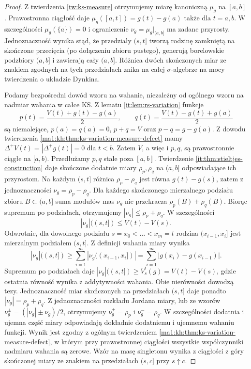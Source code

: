 \begin{proof}
Z twierdzenia \ref{tw:ks-measure} otrzymujemy miarę
kanoniczną $\mu_g$ na $[a,b]$. Prawostronna ciągłość
daje $\mu_g([a,t])=g(t)-g(a)$ także dla $t=a,b$.
W szczególności $\mu_g(\{a\})=0$ i ograniczenie
$\nu_g=\mu_g|_{(a,b]}$ ma zadane przyrosty.
Jednoznaczność wynika stąd, że przedziały $(s,t]$
tworzą rodzinę zamkniętą na skończone przecięcia
(po dołączeniu zbioru pustego), generują borelowskie
podzbiory $(a,b]$ i zawierają cały $(a,b]$.
Różnica dwóch skończonych miar ze znakiem zgodnych
na tych przedziałach znika na całej $\sigma$-algebrze
na mocy twierdzenia o układzie Dynkina.

Podamy bezpośredni dowód wzoru na wahanie, niezależny
od ogólnego wzoru na nadmiar wahania w całce KS.
Z lematu \ref{it:lem:rs-variation} funkcje
\[
 p(t)=\frac{V(t)+g(t)-g(a)}2,\qquad
 q(t)=\frac{V(t)-g(t)+g(a)}2
\]
są niemalejące, $p(a)=q(a)=0$, $p+q=V$
oraz $p-q=g-g(a)$.
Z dowodu twierdzenia
\ref{ma1:kh:thm:ks-variation-measure-defect} mamy
$\Delta^+V(t)=|\Delta^+g(t)|=0$ dla $t<b$.
Zatem $V$, a więc i $p,q$, są prawostronnie ciągłe
na $[a,b)$. Przedłużamy $p,q$ stale poza $[a,b]$.
Twierdzenie \ref{it:thm:stieltjes-construction}
daje skończone dodatnie miary $\rho_p,\rho_q$
na $(a,b]$ odpowiadające ich przyrostom.
Na każdym $(s,t]$ różnica $\rho_p-\rho_q$ jest
równa $g(t)-g(s)$, zatem z jednoznaczności
$\nu_g=\rho_p-\rho_q$.
Dla każdego skończonego mierzalnego podziału
zbioru $B\subset(a,b]$ suma modułów mas
$\nu_g$ nie przekracza $\rho_p(B)+\rho_q(B)$.
Biorąc supremum po podziałach, otrzymujemy
$|\nu_g|\le\rho_p+\rho_q$. W szczególności
\[
 |\nu_g|((s,t])\le V(t)-V(s).
\]
Odwrotnie, dla dowolnego podziału
$s=x_0<\dots<x_m=t$ rodzina $(x_{i-1},x_i]$
jest mierzalnym podziałem $(s,t]$. Z definicji
wahania miary wynika
\[
 |\nu_g|((s,t])\ge
 \sum_{i=1}^m|\nu_g((x_{i-1},x_i])|
 =\sum_{i=1}^m|g(x_i)-g(x_{i-1})|.
\]
Supremum po podziałach daje
$|\nu_g|((s,t])\ge V_s^t(g)=V(t)-V(s)$,
gdzie ostatnia równość wynika z addytywności
wahania. Obie nierówności dowodzą tezy.
Jednoznaczność miar skończonych na przedziałach
$(s,t]$ daje ponadto $|\nu_g|=\rho_p+\rho_q$.
Z jednoznaczności rozkładu Jordana miary, lub
ze wzorów $\nu_g^\pm=(|\nu_g|\pm\nu_g)/2$,
otrzymujemy $\nu_g^+=\rho_p$ i $\nu_g^-=\rho_q$.
W szczególności dodatnia i ujemna część miary
odpowiadają dokładnie dodatniemu i ujemnemu
wahaniu funkcji. Wynik jest zgodny z ogólnym
twierdzeniem \ref{ma1:kh:thm:ks-variation-measure-defect},
w którym przy prawostronnej ciągłości wszystkie
współczynniki nadmiaru wahania są zerowe.
Wzór na masę singletonu wynika z ciągłości z góry
skończonej miary ze znakiem na przedziałach $(s,c]$
przy $s\uparrow c$.


\end{proof}
